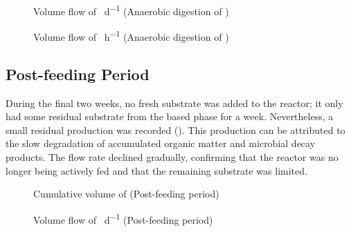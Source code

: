 \begin{figure}[H]
    \centering
    \caption{Volume flow of  \unit{\nml\per\day} (Anaerobic digestion of )}
    \label{graph:gl-flow}
\end{figure}

\begin{figure}[H]
    \centering
    \caption{Volume flow of  \unit{\nml\per\hour} (Anaerobic digestion of )}
    \label{graph:gl-flow-30}
\end{figure}

\subsection{Post-feeding Period}
\label{subsec:post_feeding}

During the final two weeks, no fresh substrate was added to the reactor; it only had some residual substrate from the  based phase for a week. Nevertheless, a small residual  production was recorded (). This production can be attributed to the slow degradation of accumulated organic matter and microbial decay products. The flow rate declined gradually, confirming that the reactor was no longer being actively fed and that the remaining substrate was limited.

\begin{figure}[H]
    \centering
    \caption{Cumulative volume of  \unit{\nml} (Post-feeding period)}
    \label{graph:extra-accumulation}
\end{figure}

\begin{figure}[H]
    \centering
    \caption{Volume flow of  \unit{\nml\per\day} (Post-feeding period)}
    \label{graph:extra-flow}
\end{figure}

